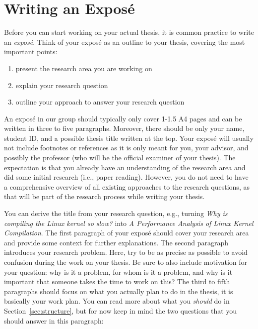 \documentclass[a4paper]{article}
\begin{document}
\section{Writing an Expos\'e}
\label{sec:expose}

Before you can start working on your actual thesis, it is common practice to write an \emph{expos\'e}.
Think of your expos\'e as an outline to your thesis, covering the most important points:

\begin{enumerate}
    \item present the research area you are working on
    \item explain your research question
    \item outline your approach to answer your research question
\end{enumerate}

An expos\'e in our group should typically only cover 1-1.5 A4 pages and can be written in three to five paragraphs.
Moreover, there should be only your name, student ID, and a possible thesis title written at the top.
Your expos\'e will usually not include footnotes or references as it is only meant for you, your advisor, and possibly the professor (who will be the official examiner of your thesis).
The expectation is that you already have an understanding of the research area and did some initial research (i.e., paper reading).
However, you do not need to have a comprehensive overview of all existing approaches to the research questions, as that will be part of the research process while writing your thesis.

You can derive the title from your research question, e.g., turning \emph{Why is compiling the Linux kernel so slow?} into \emph{A Performance Analysis of Linux Kernel Compilation}.
The first paragraph of your expos\'e should cover your research area and provide some context for further explanations.
The second paragraph introduces your research problem.
Here, try to be as precise as possible to avoid confusion during the work on your thesis.
Be sure to also include motivation for your question: why is it a problem, for whom is it a problem, and why is it important that someone takes the time to work on this?
The third to fifth paragraphs should focus on what you actually plan to do in the thesis, it is basically your work plan.
You can read more about what you \emph{should} do in Section~\ref{sec:structure}, but for now keep in mind the two questions that you should answer in this paragraph:
\end{document}
